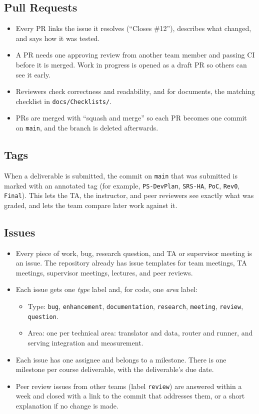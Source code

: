 \documentclass{article}
\begin{document}
\subsection{Pull Requests}

\begin{itemize}
  \item Every PR links the issue it resolves (``Closes \#12''), describes
  what changed, and says how it was tested.
  \item A PR needs one approving review from another team member and
  passing CI before it is merged. Work in progress is opened as a draft PR
  so others can see it early.
  \item Reviewers check correctness and readability, and for documents,
  the matching checklist in \texttt{docs/Checklists/}.
  \item PRs are merged with ``squash and merge'' so each PR becomes one
  commit on \texttt{main}, and the branch is deleted afterwards.
\end{itemize}

\subsection{Tags}

When a deliverable is submitted, the commit on \texttt{main} that was
submitted is marked with an annotated tag (for example, \texttt{PS-DevPlan},
\texttt{SRS-HA}, \texttt{PoC}, \texttt{Rev0}, \texttt{Final}). This lets
the TA, the instructor, and peer reviewers see exactly what was graded, and
lets the team compare later work against it.

\subsection{Issues}

\begin{itemize}
  \item Every piece of work, bug, research question, and TA or supervisor
  meeting is an issue. The repository already has issue templates for team meetings, TA
  meetings, supervisor meetings, lectures, and peer reviews.
  \item Each issue gets one \emph{type} label and, for code, one
  \emph{area} label:
  \begin{itemize}[noitemsep]
    \item Type: \texttt{bug}, \texttt{enhancement}, \texttt{documentation},
    \texttt{research}, \texttt{meeting}, \texttt{review}, \texttt{question}.
    \item Area: one per technical area: translator and data, router and
    runner, and serving integration and measurement.
  \end{itemize}
  \item Each issue has one assignee and belongs to a milestone. There is
  one milestone per course deliverable, with the deliverable's due date.
  \item Peer review issues from other teams (label \texttt{review}) are
  answered within a week and closed with a link to the commit that
  addresses them, or a short explanation if no change is made.
\end{itemize}
\end{document}
